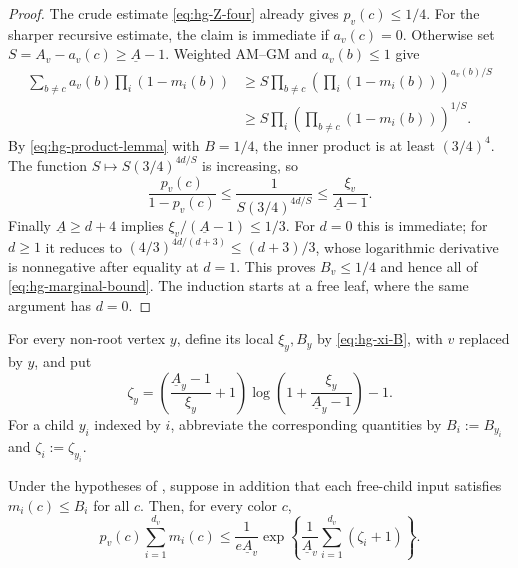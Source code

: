 \begin{proof}
The crude estimate \eqref{eq:hg-Z-four} already gives
\(p_v(c)\le1/4\).  For the sharper recursive estimate, the claim is
immediate if \(a_v(c)=0\).  Otherwise set
\(S=A_v-a_v(c)\ge\underline A-1\).  Weighted AM--GM and
\(a_v(b)\le1\) give
\begin{align*}
 \sum_{b\ne c}a_v(b)\prod_i(1-m_i(b))
 &\ge S\prod_{b\ne c}
       \left(\prod_i(1-m_i(b))\right)^{a_v(b)/S}\\
 &\ge S\prod_i
       \left(\prod_{b\ne c}(1-m_i(b))\right)^{1/S}.
\end{align*}
By \eqref{eq:hg-product-lemma} with $B=1/4$, the inner product is at
least $(3/4)^4$.  The function
\(S\mapsto S(3/4)^{4d/S}\) is increasing, so
\[
  \frac{p_v(c)}{1-p_v(c)}
  \le \frac1{S(3/4)^{4d/S}}
  \le \frac{\xi_v}{\underline A-1}.
\]
Finally \(\underline A\ge d+4\) implies
\(\xi_v/(\underline A-1)\le1/3\).  For $d=0$ this is immediate; for $d\ge1$
it reduces to
$(4/3)^{4d/(d+3)}\le(d+3)/3$, whose logarithmic derivative is
nonnegative after equality at $d=1$.  This proves $B_v\le1/4$ and hence all
of \eqref{eq:hg-marginal-bound}.  The induction starts at a free leaf, where
the same argument has $d=0$.
\end{proof}

For every non-root vertex $y$, define its local $\xi_y,B_y$ by
\eqref{eq:hg-xi-B}, with $v$ replaced by $y$, and put
\begin{equation}
  \zeta_y=
  \left(\frac{\underline A_y-1}{\xi_y}+1\right)
  \log\left(1+\frac{\xi_y}{\underline A_y-1}\right)-1.
  \label{eq:hg-zeta}
\end{equation}
For a child \(y_i\) indexed by \(i\), abbreviate the corresponding
quantities by \(B_i:=B_{y_i}\) and \(\zeta_i:=\zeta_{y_i}\).

\begin{lemma}
\label{lem:hg-continuous-amortized}
Under the hypotheses of , suppose in addition
that each free-child input satisfies $m_i(c)\le B_i$ for all $c$.  Then, for
every color $c$,
\begin{equation}
  p_v(c)\sum_{i=1}^{d_v}m_i(c)
  \le \frac1{e\underline A_v}
       \exp\left\{
          \frac1{\underline A_v}\sum_{i=1}^{d_v}(\zeta_i+1)
       \right\}.
  \label{eq:hg-amortized}
\end{equation}
\end{lemma}

